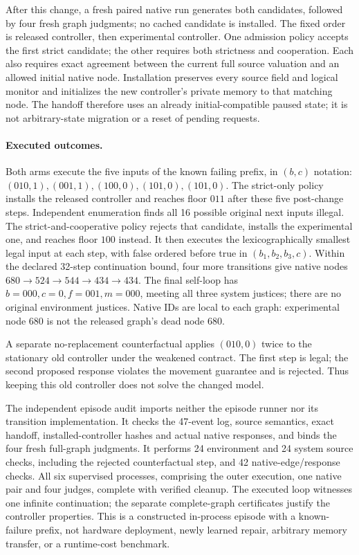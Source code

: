 After this change, a fresh paired native run generates both candidates,
followed by four fresh graph judgments; no cached candidate is installed.
The fixed order is released controller, then experimental controller.
One admission policy accepts the first strict candidate; the other
requires both strictness and cooperation. Each also requires exact
agreement between the current full source valuation and an allowed
initial native node. Installation preserves every source field and
logical monitor and initializes the new controller's private memory to
that matching node. The handoff therefore uses an already
initial-compatible paused state; it is not arbitrary-state migration
or a reset of pending requests.

\paragraph{Executed outcomes.}
Both arms execute the five inputs of the known failing prefix,
in $(b,c)$ notation:
$(010,1),(001,1),(100,0),(101,0),(101,0)$.
The strict-only policy installs the released controller and reaches
floor $011$ after these five post-change steps. Independent enumeration
finds all 16 possible original next inputs illegal.
The strict-and-cooperative policy rejects that candidate, installs the
experimental one, and reaches floor $100$ instead.
It then executes the lexicographically smallest legal input at each
step, with false ordered before true in $(b_1,b_2,b_3,c)$.
Within the declared 32-step continuation bound, four more transitions
give native nodes
$680\to524\to544\to434\to434$.
The final self-loop has $b=000,c=0,f=001,m=000$, meeting all three
system justices; there are no original environment justices.
Native IDs are local to each graph: experimental node 680 is not the
released graph's dead node 680.

A separate no-replacement counterfactual applies $(010,0)$ twice to the
stationary old controller under the weakened contract. The first step
is legal; the second proposed response violates the movement guarantee
and is rejected. Thus keeping this old controller does not solve the
changed model.

The independent episode audit imports neither the episode runner nor
its transition implementation. It checks the 47-event log, source
semantics, exact handoff, installed-controller hashes and actual native
responses, and binds the four fresh full-graph judgments. It performs
24 environment and 24 system source checks, including the rejected
counterfactual step, and 42 native-edge/response checks. All six
supervised processes, comprising the outer execution, one native pair
and four judges, complete with verified cleanup.
The executed loop witnesses one infinite continuation; the separate
complete-graph certificates justify the controller properties.
This is a constructed in-process episode with a known-failure prefix,
not hardware deployment, newly learned repair, arbitrary memory
transfer, or a runtime-cost benchmark.

